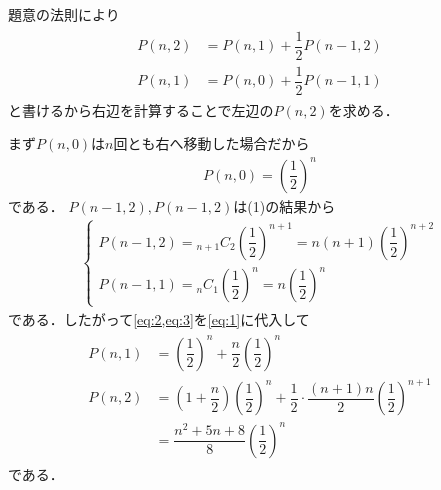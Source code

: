 \documentclass[../../main.tex]{subfiles}
\begin{document}
題意の法則により
\begin{align}
  \begin{split}
    P(n,2)&=P(n,1)+\dfrac{1}{2}P(n-1,2) \\
    P(n,1)&=P(n,0)+\dfrac{1}{2}P(n-1,1)
  \end{split} \label{eq:1}
\end{align}
と書けるから右辺を計算することで左辺の$P(n,2)$を求める．

まず$P(n,0)$は$n$回とも右へ移動した場合だから
\begin{align}
  P(n,0)=\left(\dfrac{1}{2}\right)^n \label{eq:2}
\end{align}
である．
$P(n-1,2), P(n-1,2)$は(1)の結果から
\begin{align}
  \begin{cases}
    P(n-1,2)={}_{n+1}C_2\left(\dfrac{1}{2}\right)^{n+1} = n(n+1)\left(\dfrac{1}{2}\right)^{n+2}\\
    P(n-1,1)={}_nC_1\left(\dfrac{1}{2}\right)^n = n\left(\dfrac{1}{2}\right)^n
  \end{cases} \label{eq:3}
\end{align}
である．したがって\cref{eq:2,eq:3}を\cref{eq:1}に代入して
\begin{align}
  \begin{split}
    P(n,1)&=\left(\dfrac{1}{2}\right)^n+\dfrac{n}{2}\left(\dfrac{1}{2}\right)^n \\
    P(n,2)&=\left(1+\dfrac{n}{2}\right)\left(\dfrac{1}{2}\right)^n+\dfrac{1}{2}\cdot\dfrac{(n+1)n}{2}\left(\dfrac{1}{2}\right)^{n+1} \\
    &=\dfrac{n^2+5n+8}{8}\left(\dfrac{1}{2}\right)^n
  \end{split}
\end{align}
である．
\end{document}
